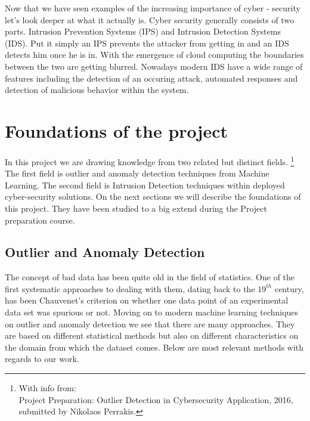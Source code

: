 \documentclass[reqno,openany,12pt]{amsbook}
\begin{document}
Now that we have seen examples of the increasing importance of cyber - security let's look deeper at what it actually is. Cyber security generally consists of two parts. Intrusion Prevention Systems (IPS) and Intrusion Detection Systems (IDS). Put it simply an IPS prevents the attacker from getting in and an IDS detects him once he is in. With the emergence of cloud computing the boundaries between the two are getting blurred\cite{intro-ids1}. Nowadays modern IDS have a wide range of features including the detection of an occuring attack, automated responses and detection of malicious behavior within the system\cite{intro-ids1}.


\chapter{Foundations of the project}

In this project we are drawing knowledge from two related but distinct fields.
\footnote{With info from:\\
Project Preparation: Outlier Detection in Cybersecurity Application, 2016, submitted by Nikolaos Perrakis.}
The first field is outlier and anomaly detection techniques from Machine Learning. The second field is Intrusion Detection techniques within deployed cyber-security solutions. On the next sections we will describe the foundations of this project. They have been studied to a big extend during the Project preparation course.

\section{Outlier and Anomaly Detection}

The concept of bad data has been quite old in the field of statistics. One of the first systematic approaches to dealing with them, dating back to the $19^{th}$ century, has been Chauvenet's criterion on  whether one data point of an experimental data set was spurious or not. Moving on to modern machine learning techniques on outlier and anomaly detection we see that there are many approaches. They are based on different statistical methods but also on different characteristics on the domain from which the dataset comes. Below are most relevant methods with regards to our work.
\end{document}
